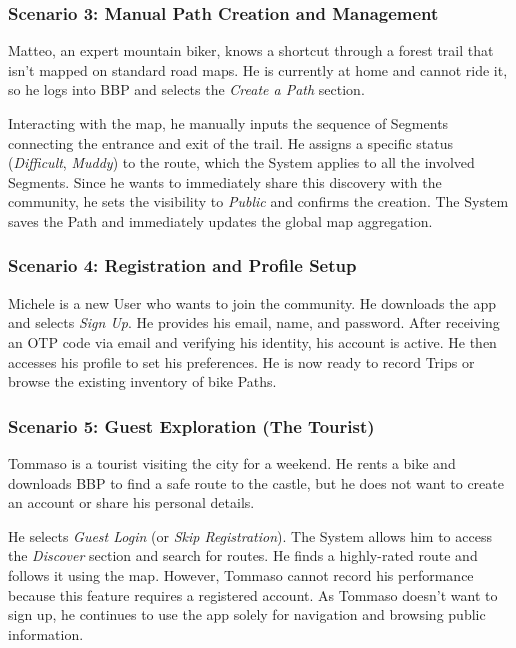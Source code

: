 \subsubsection*{Scenario 3: Manual Path Creation and Management}
Matteo, an expert mountain biker, knows a shortcut through a forest trail that isn't mapped on standard road maps. He is currently at home and cannot ride it, so he logs into BBP and selects the \emph{Create a Path} section. 

Interacting with the map, he manually inputs the sequence of Segments connecting the entrance and exit of the trail. He assigns a specific status (\emph{Difficult}, \emph{Muddy}) to the route, which the System applies to all the involved Segments. Since he wants to immediately share this discovery with the community, he sets the visibility to \emph{Public} and confirms the creation. The System saves the Path and immediately updates the global map aggregation.

\subsubsection*{Scenario 4: Registration and Profile Setup}
Michele is a new User who wants to join the community. He downloads the app and selects \emph{Sign Up}. He provides his email, name, and password. After receiving an OTP code via email and verifying his identity, his account is active. He then accesses his profile to set his preferences. He is now ready to record Trips or browse the existing inventory of bike Paths.

\subsubsection*{Scenario 5: Guest Exploration (The Tourist)}
Tommaso is a tourist visiting the city for a weekend. He rents a bike and downloads BBP to find a safe route to the castle, but he does not want to create an account or share his personal details.

He selects \emph{Guest Login} (or \emph{Skip Registration}). The System allows him to access the \emph{Discover} section and search for routes. He finds a highly-rated route and follows it using the map. However, Tommaso cannot record his performance because this feature requires a registered account. As Tommaso doesn't want to sign up, he continues to use the app solely for navigation and browsing public information.

